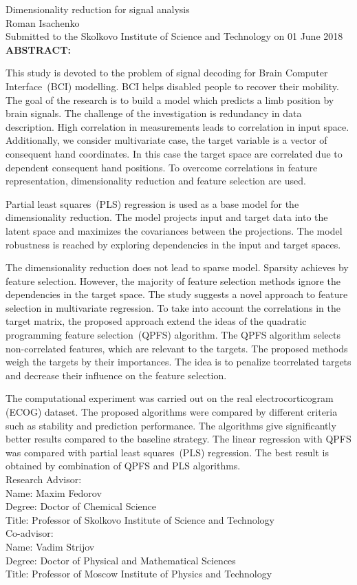 \documentclass[12pt,oneside]{article}
\theoremstyle{definition}
\begin{document}
\begin{center}
	Dimensionality reduction for signal analysis\\ 
	Roman Isachenko \\[5mm]
	Submitted to the Skolkovo Institute of Science and Technology 
	on 01 June 2018 \\[5mm]
	\textbf{ABSTRACT:} 
\end{center}

This study is devoted to the problem of signal decoding for Brain Computer Interface~(BCI) modelling. 
BCI helps disabled people to recover their mobility.
The goal of the research is to build a model which predicts a limb position by brain signals. 
The challenge of the investigation is redundancy in data description. 
High correlation in measurements leads to correlation in input space. 
Additionally, we consider multivariate case, the target variable is a vector of consequent hand coordinates. 
In this case the target space are correlated due to dependent consequent hand positions.
To overcome correlations in feature representation, dimensionality reduction and feature selection are used.

Partial least squares~(PLS) regression is used as a base model for the dimensionality reduction.
The model projects input and target data into the latent space and maximizes the covariances between the projections.
The model robustness is reached by exploring dependencies in the input and target spaces.

The dimensionality reduction does not lead to sparse model. Sparsity achieves by feature selection.
However, the majority of feature selection methods ignore the dependencies in the target space.
The study suggests a novel approach to feature selection in multivariate regression.
To take into account the correlations in the target matrix, the proposed approach extend the ideas of the quadratic programming feature selection~(QPFS) algorithm. 
The QPFS algorithm selects non-correlated features, which are relevant to the targets. The proposed methods weigh the targets by their importances. The idea is to penalize tcorrelated targets and decrease their influence on the feature selection. 

The computational experiment was carried out on the real electrocorticogram (ECOG) dataset. 
The proposed algorithms were compared by different criteria such as stability and prediction performance.
The algorithms give significantly better results compared to the baseline strategy.
The linear regression with QPFS was compared with partial least squares~(PLS) regression.
The best result is obtained by combination of QPFS and PLS algorithms.\\[5mm]
Research Advisor: \\
Name: Maxim Fedorov \\
Degree: Doctor of Chemical Science \\
Title: Professor of Skolkovo Institute of Science and Technology \\[5mm]
Co-advisor: \\
Name: Vadim Strijov \\
Degree: Doctor of Physical and Mathematical Sciences  \\
Title: Professor of Moscow Institute of Physics and Technology
\end{document}
